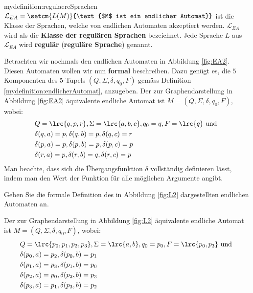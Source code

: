 \begin{mydefinition}{mydefinition:regulaereSprachen}
$\mathcal{L}_{EA} = \setcm{L(M)}{\text{$M$ ist ein endlicher Automat}}$ ist die Klasse der Sprachen, welche von endlichen Automaten akzeptiert werden. $\mathcal{L}_{EA}$ wird als die \textbf{Klasse der regulären Sprachen} bezeichnet. Jede Sprache $L$ aus $\mathcal{L}_{EA}$ wird \textbf{regulär} (\textbf{reguläre Sprache}) genannt.
\end{mydefinition}
\clearpage
\noindent
Betrachten wir nochmals den endlichen Automaten in Abbildung \cref{fig:EA2}. Diesen Automaten wollen wir nun \textbf{formal} beschreiben. Dazu genügt es, die $5$ Komponenten des $5$-Tupels $(Q,\Sigma, \delta, q_0, F)$ gemäss Definition \cref{mydefinition:endlicherAutomat}, anzugeben. Der zur Graphendarstellung in Abbildung \cref{fig:EA2} äquivalente endliche Automat  ist $M = (Q,\Sigma, \delta, q_0, F)$, wobei:
\begin{align*}
	 & Q = \lrc{q,p,r}, \Sigma = \lrc{a,b,c}, q_0 = q, F = \lrc{q}\text{ und } \\
	 & \delta(q,a) = p, \delta(q,b) = p, \delta(q,c) = r                       \\
	 & \delta(p,a) = p, \delta(p,b) = p, \delta(p,c) = p                       \\
	 & \delta(r,a) = p, \delta(r,b) = q, \delta(r,c) = p
\end{align*}
Man beachte, dass sich die Übergangsfunktion $\delta$ vollständig definieren lässt, indem man den Wert der Funktion für alle möglichen Argumente angibt.

\begin{myexercise}%
	\noindent
	Geben Sie die formale Definition des in Abbildung \cref{fig:L2} dargestellten endlichen Automaten an.\\
\end{myexercise}
\begin{myanswer}
	\noindent
	Der zur Graphendarstellung in Abbildung \cref{fig:L2} äquivalente endliche Automat  ist $M = (Q,\Sigma, \delta, q_0, F)$, wobei:
	\begin{align*}
		 & Q = \lrc{p_0, p_1, p_2, p_3}, \Sigma = \lrc{a,b}, q_0 = p_0, F = \lrc{p_0, p_3}\text{ und } \\
		 & \delta(p_0,a) = p_2, \delta(p_0,b) = p_1                                                    \\
		 & \delta(p_1,a) = p_3, \delta(p_1,b) = p_0                                                    \\
		 & \delta(p_2,a) = p_0, \delta(p_2,b) = p_3                                                    \\
		 & \delta(p_3,a) = p_1, \delta(p_3,b) = p_2
	\end{align*}
\end{myanswer}

